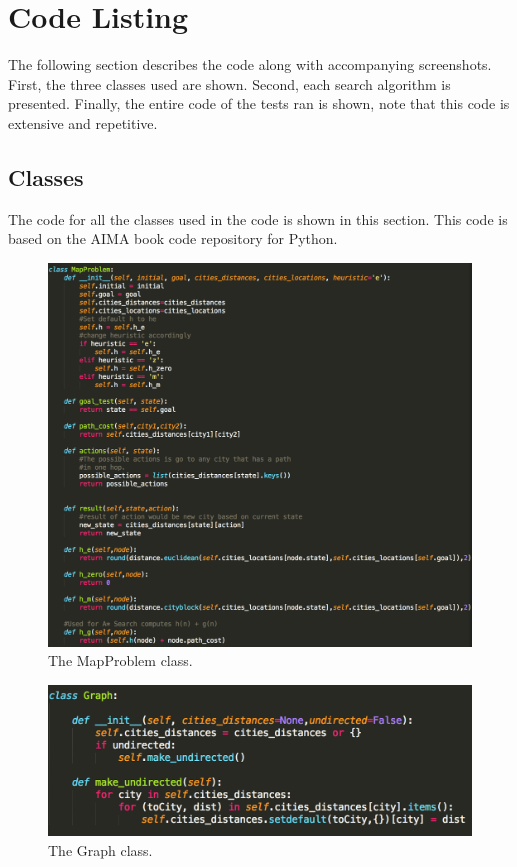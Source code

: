 \documentclass[12pt, letter]{article}
\begin{document}
\section{Code Listing}

The following section describes the code along with accompanying screenshots. First, the three classes used are shown. Second, each search algorithm is presented. Finally, the entire code of the tests ran is shown, note that this code is extensive and repetitive. 

\subsection{Classes}

The code for all the classes used in the code is shown in this section. This code is based on the AIMA book code repository for Python.

 \begin{figure}[htb]
  \centering
  \includegraphics[width=0.9 \textwidth]{./graphs/class_map.png}
  \caption{The MapProblem class.}
\end{figure}

\begin{figure}[htb]
  \centering
  \includegraphics[width=0.9 \textwidth]{./graphs/class_graph.png}
  \caption{The Graph class.}
\end{figure}
\end{document}
